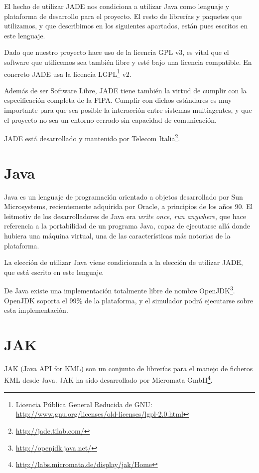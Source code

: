 El hecho de utilizar JADE nos condiciona a utilizar Java como lenguaje y
plataforma de desarrollo para el proyecto. El resto de librerías y paquetes que
utilizamos, y que describimos en los siguientes apartados, están pues escritos
en este lenguaje.

Dado que nuestro proyecto hace uso de la licencia GPL v3, es vital que el
software que utilicemos sea también libre y esté bajo una licencia compatible.
En concreto JADE usa la licencia LGPL\footnote{Licencia Pública General Reducida
de GNU: \url{http://www.gnu.org/licenses/old-licenses/lgpl-2.0.html}} v2.

Además de ser Software Libre, JADE tiene también la virtud de cumplir con la
especificación completa de la FIPA. Cumplir con dichos estándares es muy
importante para que sea posible la interacción entre sistemas multiagentes, y
que el proyecto no sea un entorno cerrado sin capacidad de comunicación.

JADE está desarrollado y mantenido por Telecom
Italia\footnote{\url{http://jade.tilab.com/}}.

\section*{Java}

Java es un lenguaje de programación orientado a objetos desarrollado por Sun
Microsystems, recientemente adquirida por Oracle, a principios de los años 90.
El leitmotiv de los desarrolladores de Java era {\em write once, run anywhere},
que hace referencia a la portabilidad de un programa Java, capaz de ejecutarse
allá donde hubiera una máquina virtual, una de las características más notorias
de la plataforma.

La elección de utilizar Java viene condicionada a la elección de utilizar JADE,
que está escrito en este lenguaje.

De Java existe una implementación totalmente libre de nombre
OpenJDK\footnote{\url{http://openjdk.java.net/}}. OpenJDK soporta el 99\% de la
plataforma, y el simulador podrá ejecutarse sobre esta implementación.

\section*{JAK}

JAK (Java API for KML) son un conjunto de librerías para el manejo de ficheros
KML desde Java. JAK ha sido desarrollado por Micromata
GmbH\footnote{\url{http://labs.micromata.de/display/jak/Home}}.

